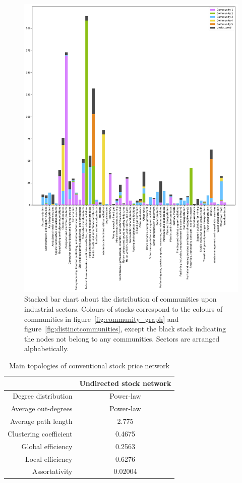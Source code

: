 \begin{figure} %
	\begin{center}
		\includegraphics[width=15cm]{community_sector_stacked}
	\end{center}
	\caption{Stacked bar chart about the distribution of communities upon industrial sectors. Colours of stacks correspond to the colours of communities in figure~\ref{fig:community_graph} and figure~\ref{fig:distinctcommunities}, except the black stack indicating the nodes not belong to any communities. Sectors are arranged alphabetically.}
	\label{fig:community_sector_stacked}
\end{figure}

\begin{table}
	\begin{center}
		\begin{tabular}{|r|c|}\hline\hline
			&Undirected stock network\\\hline
			Degree distribution&Power-law\\
			Average out-degrees&Power-law\\
			Average path length&2.775\\
			Clustering coefficient&0.4675\\
			Global efficiency&0.2563\\
			Local efficiency&0.6276\\
			Assortativity&0.02004\\
			\hline\hline
		\end{tabular}
	\end{center}
	\caption{Main topologies of conventional stock price network}\label{tab:conventional}
\end{table}

